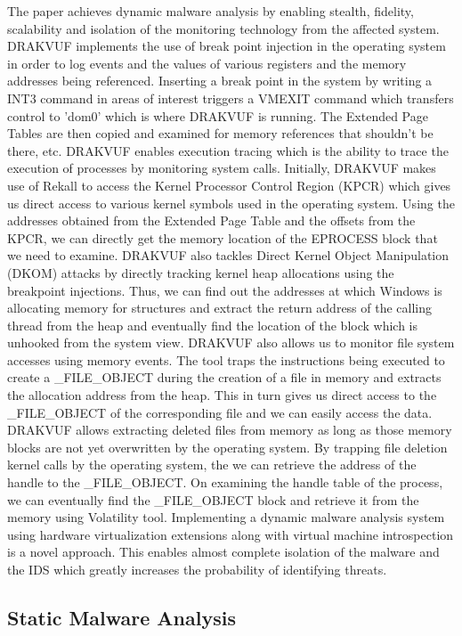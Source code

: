 \documentclass[11pt]{article}
\begin{document}
	The paper achieves dynamic malware analysis by enabling stealth, fidelity, scalability and isolation of the monitoring technology from the affected system. DRAKVUF implements the use of break point injection in the operating system in order to log events and the values of various registers and the memory addresses being referenced. Inserting a break point in the system by writing a INT3 command in areas of interest triggers a VMEXIT command which transfers control to 'dom0' which is where DRAKVUF is running. The Extended Page Tables are then copied and examined for memory references that shouldn't be there, etc. DRAKVUF enables execution tracing which is the ability to trace the execution of processes by monitoring system calls. Initially, DRAKVUF makes use of Rekall to access the Kernel Processor Control Region (KPCR) which gives us direct access to various kernel symbols used in the operating system. Using the addresses obtained from the Extended Page Table and the offsets from the KPCR, we can directly get the memory location of the EPROCESS block that we need to examine. DRAKVUF also tackles Direct Kernel Object Manipulation (DKOM) attacks by directly tracking kernel heap allocations using the breakpoint injections. Thus, we can find out the addresses at which Windows is allocating memory for structures and extract the return address of the calling thread from the heap and eventually find the location of the block which is unhooked from the system view. DRAKVUF also allows us to monitor file system accesses using memory events. The tool traps the instructions being executed to create a \_FILE\_OBJECT during the creation of a file in memory and extracts the allocation address from the heap. This in turn gives us direct access to the \_FILE\_OBJECT of the corresponding file and we can easily access the data. DRAKVUF allows extracting deleted files from memory as long as those memory blocks are not yet overwritten by the operating system. By trapping file deletion kernel calls by the operating system, the we can retrieve the address of the handle to the \_FILE\_OBJECT. On examining the handle table of the process, we can eventually find the \_FILE\_OBJECT block and retrieve it from the memory using Volatility tool.
	Implementing a dynamic malware analysis system using hardware virtualization extensions along with virtual machine introspection is a novel approach. This enables almost complete isolation of the malware and the IDS which greatly increases the probability of identifying threats.	
	
	\subsection{Static Malware Analysis}
\end{document}

